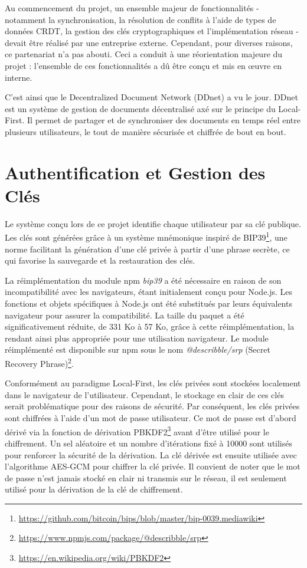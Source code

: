 Au commencement du projet, un ensemble majeur de fonctionnalités - notamment la synchronisation, la résolution de conflits à l'aide de types de données \gls{CRDT}, la gestion des clés cryptographiques et l'implémentation réseau - devait être réalisé par une entreprise externe. Cependant, pour diverses raisons, ce partenariat n'a pas abouti. Ceci a conduit à une réorientation majeure du projet : l'ensemble de ces fonctionnalités a dû être conçu et mis en \oe{}uvre en interne.

C'est ainsi que le Decentralized Document Network (DDnet) a vu le jour. \gls{DDnet} est un système de gestion de documents décentralisé axé sur le principe du Local-First. Il permet de partager et de synchroniser des documents en temps réel entre plusieurs utilisateurs, le tout de manière sécurisée et chiffrée de bout en bout.

\section{Authentification et Gestion des Clés}

Le système conçu lors de ce projet identifie chaque utilisateur par sa clé publique. Les clés sont générées grâce à un système mnémonique inspiré de BIP39\footnote{\url{https://github.com/bitcoin/bips/blob/master/bip-0039.mediawiki}}, une norme facilitant la génération d'une clé privée à partir d'une phrase secrète, ce qui favorise la sauvegarde et la restauration des clés.

La réimplémentation du module \gls{npm} \textit{bip39} a été nécessaire en raison de son incompatibilité avec les navigateurs, étant initialement conçu pour \gls{Node.js}. Les fonctions et objets spécifiques à \gls{Node.js} ont été substitués par leurs équivalents navigateur pour assurer la compatibilité. La taille du paquet a été significativement réduite, de 331 Ko à 57 Ko, grâce à cette réimplémentation, la rendant ainsi plus appropriée pour une utilisation navigateur. Le module réimplémenté est disponible sur \gls{npm} sous le nom \textit{@describble/srp} (Secret Recovery Phrase)\footnote{\url{https://www.npmjs.com/package/@describble/srp}}.

Conformément au paradigme Local-First, les clés privées sont stockées localement dans le navigateur de l'utilisateur. Cependant, le stockage en clair de ces clés serait problématique pour des raisons de sécurité. Par conséquent, les clés privées sont chiffrées à l'aide d'un mot de passe utilisateur. Ce mot de passe est d'abord dérivé via la fonction de dérivation \gls{PBKDF2}\footnote{\url{https://en.wikipedia.org/wiki/PBKDF2}} avant d'être utilisé pour le chiffrement. Un sel aléatoire et un nombre d'itérations fixé à 10000 sont utilisés pour renforcer la sécurité de la dérivation. La clé dérivée est ensuite utilisée avec l'algorithme AES-GCM pour chiffrer la clé privée. Il convient de noter que le mot de passe n'est jamais stocké en clair ni transmis sur le réseau, il est seulement utilisé pour la dérivation de la clé de chiffrement.

